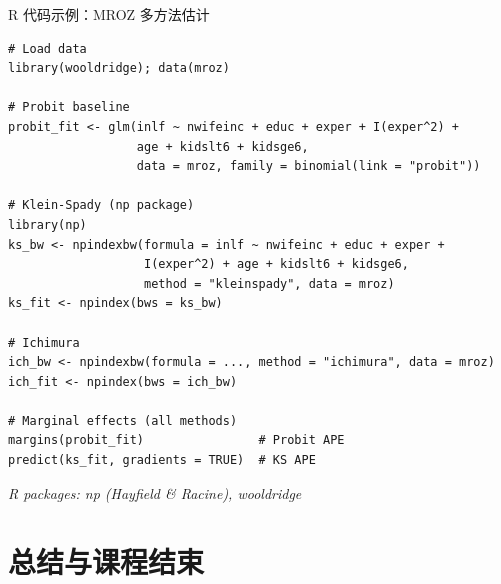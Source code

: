 \documentclass[aspectratio=169, 10pt]{beamer}
\begin{document}
\begin{frame}[fragile]{R 代码示例：MROZ 多方法估计}

  \footnotesize
\begin{verbatim}
# Load data
library(wooldridge); data(mroz)

# Probit baseline
probit_fit <- glm(inlf ~ nwifeinc + educ + exper + I(exper^2) +
                  age + kidslt6 + kidsge6,
                  data = mroz, family = binomial(link = "probit"))

# Klein-Spady (np package)
library(np)
ks_bw <- npindexbw(formula = inlf ~ nwifeinc + educ + exper +
                   I(exper^2) + age + kidslt6 + kidsge6,
                   method = "kleinspady", data = mroz)
ks_fit <- npindex(bws = ks_bw)

# Ichimura
ich_bw <- npindexbw(formula = ..., method = "ichimura", data = mroz)
ich_fit <- npindex(bws = ich_bw)

# Marginal effects (all methods)
margins(probit_fit)                # Probit APE
predict(ks_fit, gradients = TRUE)  # KS APE
\end{verbatim}
  \normalsize

  \hfill{\scriptsize\textit{R packages: np (Hayfield \& Racine), wooldridge}}

\end{frame}

\section{总结与课程结束}
\end{document}
